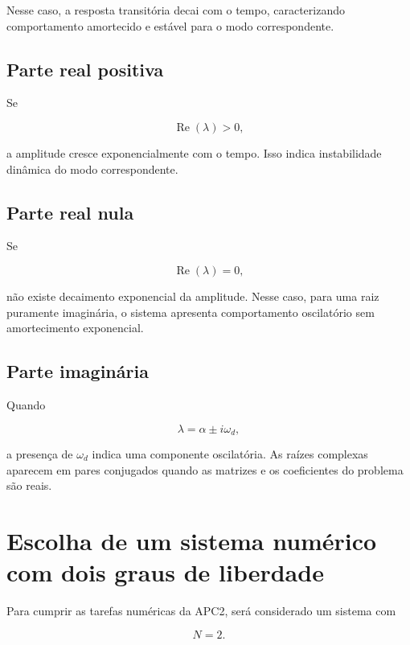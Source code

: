 \documentclass[12pt,a4paper]{article}
\begin{document}
Nesse caso, a resposta transitória decai com o tempo, caracterizando
comportamento amortecido e estável para o modo correspondente.

\subsection*{Parte real positiva}

Se

\begin{equation}
\operatorname{Re}(\lambda)>0,
\end{equation}

a amplitude cresce exponencialmente com o tempo. Isso indica instabilidade
dinâmica do modo correspondente.

\subsection*{Parte real nula}

Se

\begin{equation}
\operatorname{Re}(\lambda)=0,
\end{equation}

não existe decaimento exponencial da amplitude. Nesse caso, para uma raiz
puramente imaginária, o sistema apresenta comportamento oscilatório sem
amortecimento exponencial.

\subsection*{Parte imaginária}

Quando

\begin{equation}
\lambda=\alpha\pm i\omega_d,
\end{equation}

a presença de $\omega_d$ indica uma componente oscilatória. As raízes
complexas aparecem em pares conjugados quando as matrizes e os coeficientes do
problema são reais.

\section{Escolha de um sistema numérico com dois graus de liberdade}

Para cumprir as tarefas numéricas da APC2, será considerado um sistema com

\begin{equation}
N=2.
\end{equation}
\end{document}
